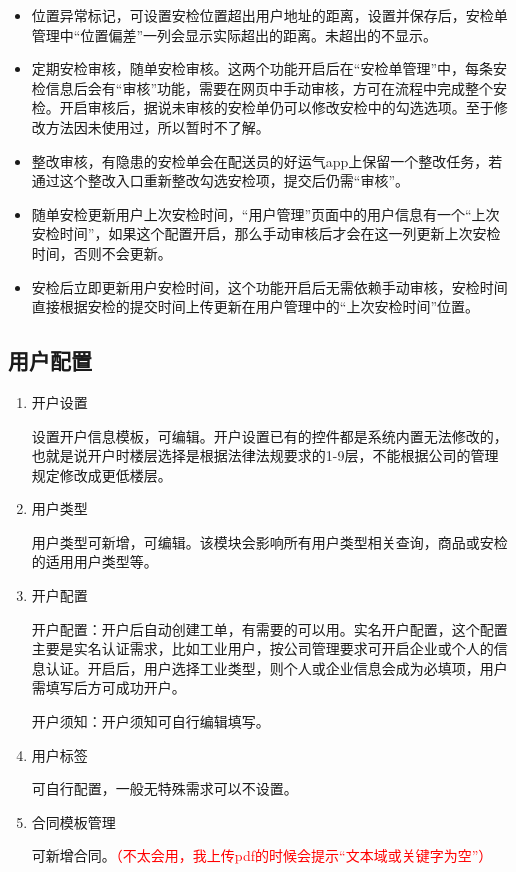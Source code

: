 \documentclass[UTF8]{ctexart}
\begin{document}
\begin{enumerate}
	\begin{itemize} 
	
	\item 位置异常标记，可设置安检位置超出用户地址的距离，设置并保存后，安检单管理中“位置偏差”一列会显示实际超出的距离。未超出的不显示。
	
	\item 定期安检审核，随单安检审核。这两个功能开启后在“安检单管理”中，每条安检信息后会有“审核”功能，需要在网页中手动审核，方可在流程中完成整个安检。开启审核后，据说未审核的安检单仍可以修改安检中的勾选选项。至于修改方法因未使用过，所以暂时不了解。
	
	\item 整改审核，有隐患的安检单会在配送员的好运气app上保留一个整改任务，若通过这个整改入口重新整改勾选安检项，提交后仍需“审核”。
	
	\item 随单安检更新用户上次安检时间，“用户管理”页面中的用户信息有一个“上次安检时间”，如果这个配置开启，那么手动审核后才会在这一列更新上次安检时间，否则不会更新。
	
	\item 安检后立即更新用户安检时间，这个功能开启后无需依赖手动审核，安检时间直接根据安检的提交时间上传更新在用户管理中的“上次安检时间”位置。
	\end{itemize}

\end{enumerate}


\subsection{用户配置}
\begin{enumerate}
	\item 开户设置
	
	设置开户信息模板，可编辑。开户设置已有的控件都是系统内置无法修改的，也就是说开户时楼层选择是根据法律法规要求的1-9层，不能根据公司的管理规定修改成更低楼层。
	
	\item 用户类型
	
	用户类型可新增，可编辑。该模块会影响所有用户类型相关查询，商品或安检的适用用户类型等。
	
	\item 开户配置
	
	开户配置：开户后自动创建工单，有需要的可以用。实名开户配置，这个配置主要是实名认证需求，比如工业用户，按公司管理要求可开启企业或个人的信息认证。开启后，用户选择工业类型，则个人或企业信息会成为必填项，用户需填写后方可成功开户。
	
	开户须知：开户须知可自行编辑填写。
	
	\item 用户标签
	
	可自行配置，一般无特殊需求可以不设置。
	
	\item 合同模板管理
	
	可新增合同。\textcolor{red}{（不太会用，我上传pdf的时候会提示“文本域或关键字为空”）}	
	
\end{enumerate}
\end{document}
